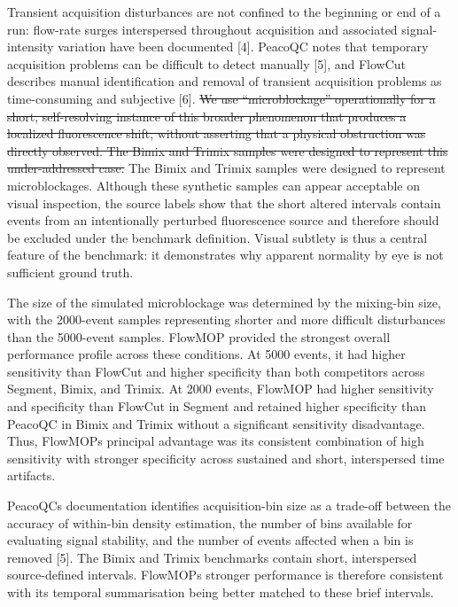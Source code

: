 \documentclass[ASNA]{latex/wiley/USG}
\begin{document}
Transient acquisition disturbances are not confined to the beginning or
end of a run: flow-rate surges interspersed throughout acquisition and
associated signal-intensity variation have been documented {[}4{]}.
PeacoQC notes that temporary acquisition problems can be difficult to
detect manually {[}5{]}, and FlowCut describes manual identification and
removal of transient acquisition problems as time-consuming and
subjective {[}6{]}. {\color{revisionred}\sout{We use ``microblockage''
operationally for a short, self-resolving instance of this broader
phenomenon that produces a localized fluorescence shift, without
asserting that a physical obstruction was directly observed. The Bimix
and Trimix samples were designed to represent this under-addressed
case.}} {\color{revisionblue}The Bimix and Trimix samples were designed
to represent microblockages.} Although these synthetic samples can
appear acceptable on visual inspection, the source labels show that the
short altered intervals contain events from an intentionally perturbed
fluorescence source and therefore should be excluded under the benchmark
definition. Visual subtlety is thus a central feature of the benchmark:
it demonstrates why apparent normality by eye is not sufficient ground
truth.

The size of the simulated microblockage was determined by the mixing-bin
size, with the 2000-event samples representing shorter and more
difficult disturbances than the 5000-event samples. FlowMOP provided the
strongest overall performance profile across these conditions. At 5000
events, it had higher sensitivity than FlowCut and higher specificity
than both competitors across Segment, Bimix, and Trimix. At 2000 events,
FlowMOP had higher sensitivity and specificity than FlowCut in Segment
and retained higher specificity than PeacoQC in Bimix and Trimix without
a significant sensitivity disadvantage. Thus, FlowMOP\textquotesingle s
principal advantage was its consistent combination of high sensitivity
with stronger specificity across sustained and short, interspersed time
artifacts.

PeacoQC\textquotesingle s documentation identifies acquisition-bin size
as a trade-off between the accuracy of within-bin density estimation,
the number of bins available for evaluating signal stability, and the
number of events affected when a bin is removed {[}5{]}. The Bimix and
Trimix benchmarks contain short, interspersed source-defined intervals.
FlowMOP\textquotesingle s stronger performance is therefore consistent
with its temporal summarisation being better matched to these brief
intervals.
\end{document}
